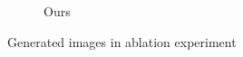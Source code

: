 \begin{figure}
\begin{subfigure}[t]{0.32\linewidth}
            \vspace{-0.2in}
            \caption{\small Ours}
            \label{figc:ablation_ours}
        \end{subfigure}
        \vspace{-0.1in}
        \caption{\small Generated images in ablation experiment}
    \label{fig:ablation_images}
\end{figure}